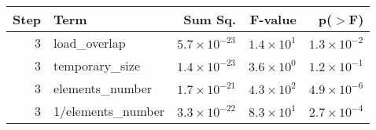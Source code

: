 \begin{table}[ht]
\centering
\begin{tabular}{rlrrr}
  \toprule
Step & Term & Sum Sq. & F-value & p($>$F) \\ 
  \midrule
3 & load\_overlap & $5.7 \times 10^{-23}$ & $1.4 \times 10^{1}$ & $1.3 \times 10^{-2}$ \\ 
  3 & temporary\_size & $1.4 \times 10^{-23}$ & $3.6 \times 10^{0}$ & $1.2 \times 10^{-1}$ \\ 
  3 & elements\_number & $1.7 \times 10^{-21}$ & $4.3 \times 10^{2}$ & $4.9 \times 10^{-6}$ \\ 
  3 & 1/elements\_number & $3.3 \times 10^{-22}$ & $8.3 \times 10^{1}$ & $2.7 \times 10^{-4}$ \\ 
   \bottomrule
\end{tabular}
\end{table}

